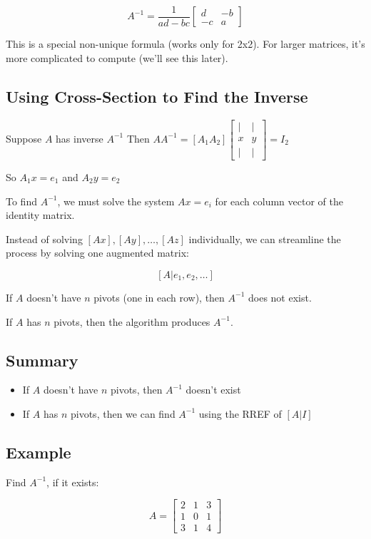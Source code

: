 \documentclass[12pt,a4paper]{article}
\begin{document}
\[A^{-1} = \frac{1}{ad-bc} \begin{bmatrix} d & -b \\ -c & a \end{bmatrix}\]

This is a special non-unique formula (works only for 2x2). For larger matrices, it's more complicated to compute (we'll see this later).

\subsection{Using Cross-Section to Find the Inverse}

Suppose $A$ has inverse $A^{-1}$
Then $AA^{-1} = [A_1 A_2] \begin{bmatrix} | & | \\ x & y \\ | & | \end{bmatrix} = I_2$

So $A_1x = e_1$ and $A_2y = e_2$

To find $A^{-1}$, we must solve the system $Ax = e_i$ for each column vector of the identity matrix.

Instead of solving $[Ax], [Ay], \ldots, [Az]$ individually, we can streamline the process by solving one augmented matrix:

\[[A|e_1, e_2, \ldots]\]

If $A$ doesn't have $n$ pivots (one in each row), then $A^{-1}$ does not exist.

If $A$ has $n$ pivots, then the algorithm produces $A^{-1}$.

\subsection{Summary}
\begin{itemize}
    \item If $A$ doesn't have $n$ pivots, then $A^{-1}$ doesn't exist
    \item If $A$ has $n$ pivots, then we can find $A^{-1}$ using the RREF of $[A|I]$
\end{itemize}

\subsection{Example}

Find $A^{-1}$, if it exists:

\[A = \begin{bmatrix} 2 & 1 & 3 \\ 1 & 0 & 1 \\ 3 & 1 & 4 \end{bmatrix}\]
\end{document}
